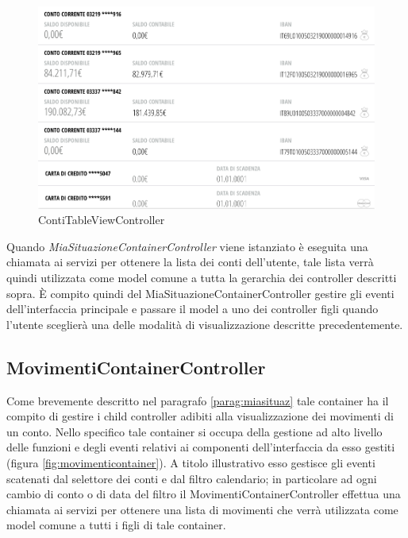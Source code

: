 \begin{figure}[!htbp]
\centering
\includegraphics[scale=0.35]{dettagli/contiList.png}
\caption{ContiTableViewController}
\end{figure}
Quando \emph{MiaSituazioneContainerController} viene istanziato è eseguita una chiamata ai servizi per ottenere la lista dei conti dell'utente, tale lista verrà quindi utilizzata come model comune a tutta la gerarchia dei controller descritti sopra. È compito quindi del MiaSituazioneContainerController gestire gli eventi dell'interfaccia principale e passare il model a uno dei controller figli quando l'utente sceglierà una delle modalità di visualizzazione descritte precedentemente. 

\subsection{MovimentiContainerController}

Come brevemente descritto nel paragrafo \ref{parag:miasituaz} tale container ha il compito di gestire i child controller adibiti alla visualizzazione dei movimenti di un conto. 
Nello specifico tale container si occupa della gestione ad alto livello delle funzioni e degli eventi relativi ai componenti dell'interfaccia da esso gestiti (figura \ref{fig:movimenticontainer}). A titolo illustrativo esso gestisce gli eventi scatenati dal selettore dei conti e dal filtro calendario; in particolare ad ogni cambio di conto o di data del filtro il MovimentiContainerController effettua una chiamata ai servizi per ottenere una lista di movimenti che verrà utilizzata come model comune a tutti i figli di tale container.

